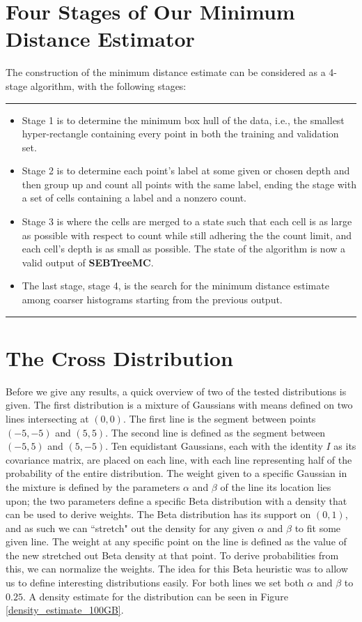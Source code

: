 \documentclass{report}
\begin{document}
\section{Four Stages of Our Minimum Distance Estimator}\label{S:4Stages}
The construction of the minimum distance estimate can be considered as a 4-stage algorithm, with the following stages: \\
\noindent\rule{\textwidth}{1.0pt}
\begin{itemize}
\item Stage 1 is to determine the minimum box hull of the data, i.e., the
smallest hyper-rectangle containing every point in both the training and validation set. 
\item Stage 2 is to determine each point's label at some given or chosen depth 
and then group up and count all points with the same label, ending the stage with a set of cells containing a label and a nonzero count.  
\item Stage 3 is where the cells 
are merged to a state such that each cell is as large as possible with respect to count while still adhering the the count limit, and each
cell's depth is as small as possible. The state of the algorithm is now a valid output of \textbf{SEBTreeMC}. 
\item The last stage, stage 4, is the search for the 
minimum distance estimate among coarser histograms starting from the previous output.
\end{itemize}
\noindent\rule{\textwidth}{1.0pt}

\section{The Cross Distribution}
Before we give any results, a quick overview of two of the tested distributions is given. The first distribution is a mixture of Gaussians with means defined
on two lines intersecting at $(0,0)$. The first line is the segment between points $(-5, -5)$ and $(5,5)$. 
The second line is defined as the segment between $(-5, 5)$ and $(5,-5)$. Ten equidistant Gaussians, each with the identity $I$ as its covariance matrix, are placed on each line, with each line 
representing half of the probability of the entire distribution.
The weight given to a specific Gaussian in the mixture is defined by the parameters $\alpha$ and $\beta$ of the line its location lies upon;
the two parameters define a specific Beta distribution with a density that can be used to derive weights. The Beta distribution has its support
on $(0,1)$, and as such we can ``stretch" out the density for any given $\alpha$ and $\beta$ to fit some given line. The weight at any specific point on the line is defined as the value of
the new stretched out Beta density at that point. To derive probabilities from this, we can normalize the weights. The idea for this Beta heuristic was to allow
us to define interesting distributions easily. For both lines we set both $\alpha$ and $\beta$ to $0.25$. A density estimate for the distribution can be seen in Figure \ref{density_estimate_100GB}.
\end{document}
